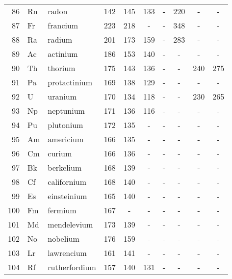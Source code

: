 \documentclass[   %
  final,          %
  a4paper,        %
  8pt
]{extarticle}
\begin{document}
\begin{ThreePartTable}
\begin{longtable}{rll*{7}{S[table-format=3.1, table-space-text-post = , table-align-text-post = false]}}
 86  & Rn   & radon         & 142   & 145   & 133   & {-}   & 220 & {-}        & {-}     \\
 87  & Fr   & francium      & 223   & 218   & {-}   & {-}   & 348 & {-}        & {-}     \\
 88  & Ra   & radium        & 201   & 173   & 159   & {-}   & 283 & {-}        & {-}     \\
 89  & Ac   & actinium      & 186   & 153   & 140   & {-}   & {-}          & {-}        & {-}     \\
 90  & Th   & thorium       & 175   & 143   & 136   & {-}   & {-}          & 240        & 275     \\
 91  & Pa   & protactinium  & 169   & 138   & 129   & {-}   & {-}          & {-}        & {-}     \\
 92  & U    & uranium       & 170   & 134   & 118   & {-}   & {-}          & 230        & 265     \\
 93  & Np   & neptunium     & 171   & 136   & 116   & {-}   & {-}          & {-}        & {-}     \\
 94  & Pu   & plutonium     & 172   & 135   & {-}   & {-}   & {-}          & {-}        & {-}     \\
 95  & Am   & americium     & 166   & 135   & {-}   & {-}   & {-}          & {-}        & {-}     \\
 96  & Cm   & curium        & 166   & 136   & {-}   & {-}   & {-}          & {-}        & {-}     \\
 97  & Bk   & berkelium     & 168   & 139   & {-}   & {-}   & {-}          & {-}        & {-}     \\
 98  & Cf   & californium   & 168   & 140   & {-}   & {-}   & {-}          & {-}        & {-}     \\
 99  & Es   & einsteinium   & 165   & 140   & {-}   & {-}   & {-}          & {-}        & {-}     \\
100  & Fm   & fermium       & 167   & {-}   & {-}   & {-}   & {-}          & {-}        & {-}     \\
101  & Md   & mendelevium   & 173   & 139   & {-}   & {-}   & {-}          & {-}        & {-}     \\
102  & No   & nobelium      & 176   & 159   & {-}   & {-}   & {-}          & {-}        & {-}     \\
103  & Lr   & lawrencium    & 161   & 141   & {-}   & {-}   & {-}          & {-}        & {-}     \\
104  & Rf   & rutherfordium & 157   & 140   & 131   & {-}   & {-}          & {-}        & {-}     \\

\end{longtable}
\end{ThreePartTable}
\end{document}

